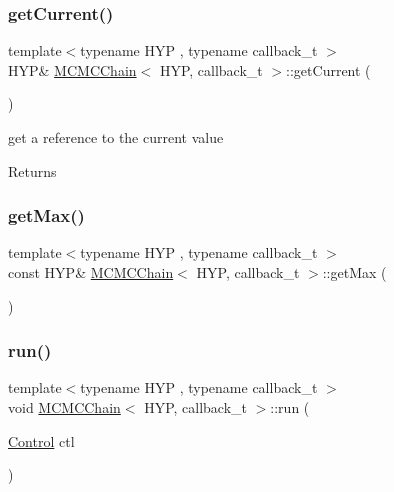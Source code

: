 \subsubsection{\texorpdfstring{get\+Current()}{getCurrent()}}
{\footnotesize\ttfamily template$<$typename H\+YP , typename callback\+\_\+t $>$ \\
H\+YP\& \hyperlink{class_m_c_m_c_chain}{M\+C\+M\+C\+Chain}$<$ H\+YP, callback\+\_\+t $>$\+::get\+Current (\begin{DoxyParamCaption}{ }\end{DoxyParamCaption})\hspace{0.3cm}{\ttfamily [inline]}}

get a reference to the current value \begin{DoxyReturn}{Returns}

\end{DoxyReturn}
\mbox{\label{class_m_c_m_c_chain_aa5c2bf3cae9a5959cab43e04b1201ed2}} 
\subsubsection{\texorpdfstring{get\+Max()}{getMax()}}
{\footnotesize\ttfamily template$<$typename H\+YP , typename callback\+\_\+t $>$ \\
const H\+YP\& \hyperlink{class_m_c_m_c_chain}{M\+C\+M\+C\+Chain}$<$ H\+YP, callback\+\_\+t $>$\+::get\+Max (\begin{DoxyParamCaption}{ }\end{DoxyParamCaption})\hspace{0.3cm}{\ttfamily [inline]}}

\mbox{\label{class_m_c_m_c_chain_aef30134b1915b8b494040771480d6b80}} 
\subsubsection{\texorpdfstring{run()}{run()}\hspace{0.1cm}{\footnotesize\ttfamily [1/2]}}
{\footnotesize\ttfamily template$<$typename H\+YP , typename callback\+\_\+t $>$ \\
void \hyperlink{class_m_c_m_c_chain}{M\+C\+M\+C\+Chain}$<$ H\+YP, callback\+\_\+t $>$\+::run (\begin{DoxyParamCaption}\item[{\hyperlink{struct_control}{Control}}]{ctl }\end{DoxyParamCaption})\hspace{0.3cm}{\ttfamily [inline]}}

